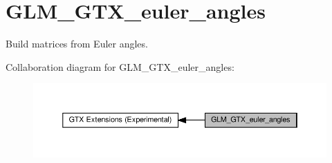 \hypertarget{group__gtx__euler__angles}{}\section{G\+L\+M\+\_\+\+G\+T\+X\+\_\+euler\+\_\+angles}
\label{group__gtx__euler__angles}


Build matrices from Euler angles.  


Collaboration diagram for G\+L\+M\+\_\+\+G\+T\+X\+\_\+euler\+\_\+angles\+:\nopagebreak
\begin{figure}[H]
\begin{center}
\leavevmode
\includegraphics[width=350pt]{group__gtx__euler__angles}
\end{center}
\end{figure}

